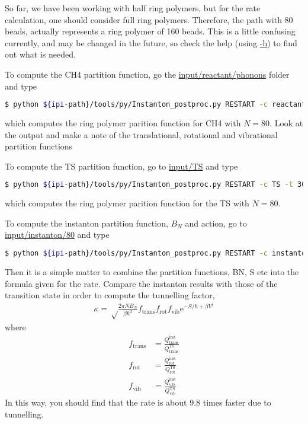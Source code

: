 \documentclass{article}
\begin{document}
\begin{Exercise}[label={post},title={Postprocessing for the rate calculation}]

So far, we have been working with half ring polymers, but for the rate calculation, one should consider full ring polymers.
Therefore, the path with 80 beads, actually represents a ring polymer of 160 beads.
This is a little confusing currently, and may be changed in the future, so check the help (using \url{-h}) to find out what is needed.

\Question
To compute the CH4 partition function, go the \url{input/reactant/phonons} folder and type
\begin{lstlisting}[language=bash]
$ python ${ipi-path}/tools/py/Instanton_postproc.py RESTART -c reactant -t 300 -n 80 -f 5
\end{lstlisting}
which computes the ring polymer parition function for CH4 with $N=80$.
Look at the output and make a note of the translational, rotational and vibrational partition functions

\Question
To compute the TS partition function, go to \url{input/TS} and type
\begin{lstlisting}[language=bash]
$ python ${ipi-path}/tools/py/Instanton_postproc.py RESTART -c TS -t 300 -n 80
\end{lstlisting}
which computes the ring polymer parition function for the TS with $N=80$.

\Question
To compute the instanton partition function, $B_N$ and action,
go to \url{input/instanton/80} and type
\begin{lstlisting}[language=bash]
$ python ${ipi-path}/tools/py/Instanton_postproc.py RESTART -c instanton -t 300
\end{lstlisting}

Then it is a simple matter to combine the partition functions, BN, S etc into the formula given for the rate.
Compare the instanton results with those of the transition state in order to compute the tunnelling factor,
\begin{align}
	\kappa = \sqrt\frac{2\pi NB_N}{\beta \hbar^2}
		f_\text{trans} f_\text{rot} f_\text{vib}
		\mathrm{e}^{-S/\hbar+\beta V^\ddag}
\end{align}
where
\begin{align}
	f_\text{trans} &= \frac{Q_\text{trans}^\text{inst}}{Q_\text{trans}^\text{TS}} \\
	f_\text{rot} &= \frac{Q_\text{rot}^\text{inst}}{Q_\text{rot}^\text{TS}} \\
	f_\text{vib} &= \frac{Q_\text{vib}^\text{inst}}{Q_\text{vib}^\text{TS}}
\end{align}
In this way, you should find that the rate is about 9.8 times faster due to tunnelling.

\end{Exercise}




\end{document}
